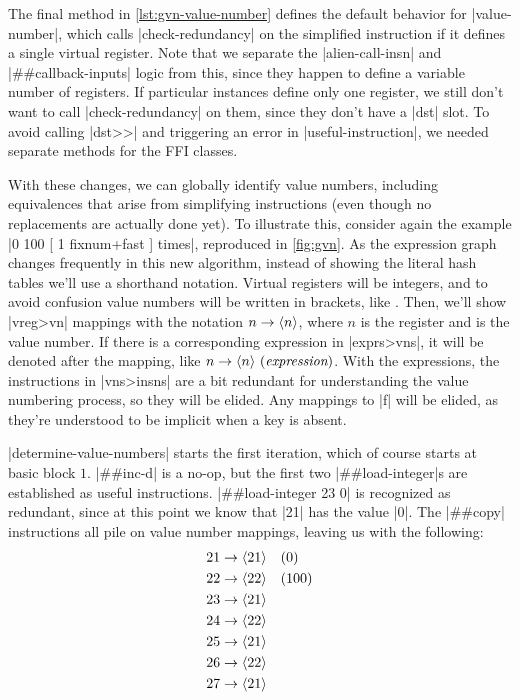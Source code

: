 The final method in \vref{lst:gvn-value-number} defines the default behavior
for \factor|value-number|, which calls \factor|check-redundancy| on the
simplified instruction if it defines a single virtual register.  Note that we
separate the \factor|alien-call-insn| and \factor|##callback-inputs| logic from
this, since they happen to define a variable number of registers.  If
particular instances define only one register, we still don't want to call
\factor|check-redundancy| on them, since they don't have a \factor|dst| slot.
To avoid calling \factor|dst>>| and triggering an error in
\factor|useful-instruction|, we needed separate methods for the \gls{FFI}
classes.


With these changes, we can globally identify value numbers, including
equivalences that arise from simplifying instructions (even though no
replacements are actually done yet).  To illustrate this, consider again the
example
%
\factor|0 100 [ 1 fixnum+fast ] times|,
%
reproduced in \vref{fig:gvn}.  As the expression graph changes frequently in
this new algorithm, instead of showing the literal hash tables we'll use a
shorthand notation.  Virtual registers will be integers, and to avoid confusion
value numbers will be written in brackets, like .  Then, we'll show
\factor|vreg>vn| mappings with the notation $n\to\langle n\rangle$, where $n$ is the
register and  is the value number.  If there is a corresponding
expression in \factor|exprs>vns|, it will be denoted after the mapping, like
$n\to\langle n\rangle~(\textit{expression})$.  With the expressions, the instructions in
\factor|vns>insns| are a bit redundant for understanding the value numbering
process, so they will be elided.  Any mappings to \factor|f| will be elided, as
they're understood to be implicit when a key is absent.


\factor|determine-value-numbers| starts the first iteration, which of course
starts at basic block $1$.  \factor|##inc-d| is a no-op, but the first two
\factor|##load-integer|s are established as useful instructions.
%
\factor|##load-integer 23 0|
%
is recognized as redundant, since at this point we know that \factor|21| has
the value \factor|0|.  The \factor|##copy| instructions all pile on value
number mappings, leaving us with the following:
%
\begin{align*}
  21 &\to \langle 21\rangle \quad (0)  \\
  22 &\to \langle 22\rangle \quad (100)\\
  23 &\to \langle 21\rangle            \\
  24 &\to \langle 22\rangle            \\
  25 &\to \langle 21\rangle            \\
  26 &\to \langle 22\rangle            \\
  27 &\to \langle 21\rangle
\end{align*}


